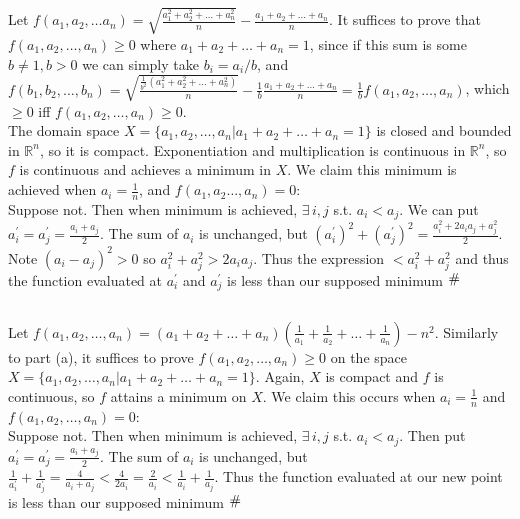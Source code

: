\documentclass{article}
\newcommand{\contra}{\raisebox{\depth}{\#}}
\begin{document}
\subsection{}
Let $f(a_1,a_2,\dots a_n) = \sqrt{\frac{a_1^2 + a_2^2 + \dots + a_n^2}{n}} - \frac{a_1 + a_2 + \dots + a_n}{n}$. It suffices to prove that $f(a_1,a_2,\dots,a_n) \geq 0$ where $a_1 + a_2 + \dots + a_n = 1$, since if this sum is some $b \neq 1,b>0$ we can simply take $b_i = a_i/b$, and $f(b_1,b_2,\dots,b_n) = \sqrt{\frac{\frac{1}{b^2}(a_1^2 + a_2^2 + \dots + a_n^2)}{n}} - \frac{1}{b}\frac{a_1 + a_2 + \dots + a_n}{n} = \frac{1}{b}f(a_1,a_2,\dots,a_n)$, which $\geq 0$ iff $f(a_1,a_2,\dots,a_n)\geq 0$.\\
The domain space $X = \{a_1,a_2,\dots,a_n | a_1 + a_2 + \dots + a_n = 1\}$ is closed and bounded in $\mathbb{R}^n$, so it is compact. Exponentiation and multiplication is continuous in $\mathbb{R}^n$, so $f$ is continuous and achieves a minimum in $X$. We claim this minimum is achieved when $a_i = \frac{1}{n}$, and $f(a_1,a_2\dots,a_n) = 0$:\\
Suppose not. Then when minimum is achieved, $\exists \, i,j$ s.t. $a_i < a_j$. We can put $a_i^{'} = a_j^{'} = \frac{a_i+a_j}{2}$. The sum of $a_i$ is unchanged, but $(a_i^{'})^2 + (a_j^{'})^2 = \frac{a_i^2 + 2a_ia_j + a_j^2}{2}$. Note $(a_i-a_j)^2 > 0$ so $a_i^2 + a_j^2 > 2a_ia_j$. Thus the expression $< a_i^2 + a_j^2$ and thus the function evaluated at $a_i^{'}$ and $a_j^{'}$ is less than our supposed minimum $\contra$

\subsection{}
Let $f(a_1,a_2,\dots,a_n) = (a_1+a_2+\dots+a_n)(\frac{1}{a_1} + \frac{1}{a_2} + \dots + \frac{1}{a_n}) - n^2$. Similarly to part (a), it suffices to prove $f(a_1,a_2,\dots,a_n) \geq 0$ on the space $X = \{a_1,a_2,\dots,a_n | a_1+a_2+\dots+a_n = 1\}$. Again, $X$ is compact and $f$ is continuous, so $f$ attains a minimum on $X$. We claim this occurs when $a_i = \frac{1}{n}$ and $f(a_1,a_2,\dots,a_n) = 0$:\\
Suppose not. Then when minimum is achieved, $\exists \, i,j$ s.t. $a_i < a_j$. Then put $a_i^{'} = a_j^{'} = \frac{a_i+a_j}{2}$. The sum of $a_i$ is unchanged, but $\frac{1}{a_i^{'}} + \frac{1}{a_j^{'}} = \frac{4}{a_i + a_j} < \frac{4}{2a_i} = \frac{2}{a_i} < \frac{1}{a_i} + \frac{1}{a_j}$. Thus the function evaluated at our new point is less than our supposed minimum $\contra$
\end{document}
